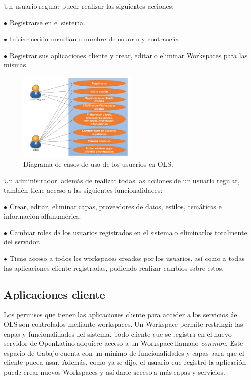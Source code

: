 Un usuario regular puede realizar las siguientes acciones:

$\bullet$ Registrarse en el sistema.

$\bullet$ Iniciar sesi\'on mendiante nombre de usuario y contrase\~na.

$\bullet$ Registrar sus aplicaciones cliente y crear, editar o eliminar Workspaces para las mismas.



\begin{figure} 
\vspace{-20pt} 
\begin{center} 
\includegraphics[width=0.52\textwidth]{images/casosdeUsousuario.png} 
\end{center} \vspace{-20pt} \caption{Diagrama de casos de uso de los usuarios en OLS.} \label{casos1}\vspace{-10pt} 
\end{figure}

Un administrador, adem\'as de realizar todas las acciones de un usuario regular, tambi\'en tiene acceso a las siguientes funcionalidades:

$\bullet$ Crear, editar, eliminar capas, proveedores de datos, estilos, tem\'aticos e informaci\'on alfanum\'erica.

$\bullet$ Cambiar roles de los usuarios registrados en el sistema o eliminarlos totalmente del servidor.

$\bullet$ Tiene acceso a todos los workspaces creados por los usuarios, as\'i como a todas las aplicaciones cliente registradas, pudiendo realizar cambios sobre estos.


\subsection{Aplicaciones cliente}
Los permisos que tienen las aplicaciones cliente para acceder a los servicios de OLS son controlados mediante workspaces. Un Workspace permite restringir las capas y funcionalidades del sistema. Todo cliente que se registra en el nuevo servidor de OpenLatino adquiere acceso a un Workspace llamado \textit{common}. Este espacio de trabajo cuenta con un m\'inimo de funcionalidades y capas para que el cliente pueda usar. Adem\'as, como ya se dijo, el usuario que registr\'o la aplicaci\'on puede crear nuevos Workspaces y as\'i darle acceso a m\'as capas y servicios.

